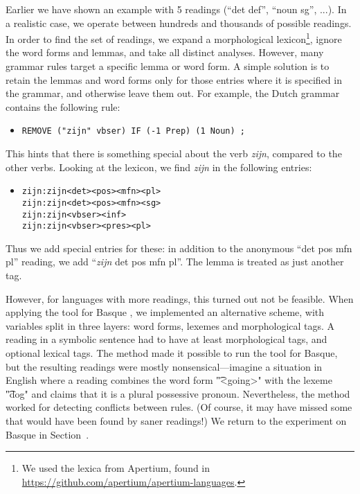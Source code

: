 {{Earlier we have shown an example with 5 readings (``det def'', ``noun sg'', ...). In a realistic case, we operate between hundreds and thousands of possible readings. 
In order to find the set of readings, we expand a morphological lexicon\footnote{We used the lexica from Apertium, found in \url{https://github.com/apertium/apertium-languages}.}, ignore the word forms and lemmas, and take all distinct analyses. 
However, many grammar rules target a specific lemma or word form.
A simple solution is to retain the lemmas and word forms only for those entries where it is specified in the grammar, and otherwise leave them out. For example, the Dutch grammar contains the following rule:

\begin{itemize}
 \item[] \texttt{REMOVE ("zijn" vbser) IF (-1 Prep) (1 Noun) ;}
\end{itemize}

This hints that there is something special about the verb \emph{zijn}, compared to the other verbs. Looking at the lexicon, we find \emph{zijn} in the following entries:

\begin{itemize}
 \item[] 
\begin{verbatim}zijn:zijn<det><pos><mfn><pl>
zijn:zijn<det><pos><mfn><sg>
zijn:zijn<vbser><inf>
zijn:zijn<vbser><pres><pl>\end{verbatim}
\end{itemize}

Thus we add special entries for these: in addition to the anonymous
``det pos mfn pl'' reading, we add ``\emph{zijn} det pos mfn pl''. 
The lemma is treated as just another tag.

However, for languages with more readings, this turned out not be
feasible. When applying the tool for Basque \cite{listenmaa2017basque}, 
we implemented an alternative scheme, with variables split in three
layers: word forms, lexemes and morphological tags. A reading in a
symbolic sentence had to have at least morphological tags, and
optional lexical tags. The method made it possible to run the tool for
Basque, but the resulting readings were mostly nonsensical---imagine a
situation in English where a reading combines the word form
\t{"<going>"} with the lexeme \t{"dog"} and claims that it is a plural
possessive pronoun. Nevertheless, the method worked for detecting
conflicts between rules. (Of course, it may have missed some that
would have been found by saner readings!) We return to the experiment
on Basque in Section~.

}}
